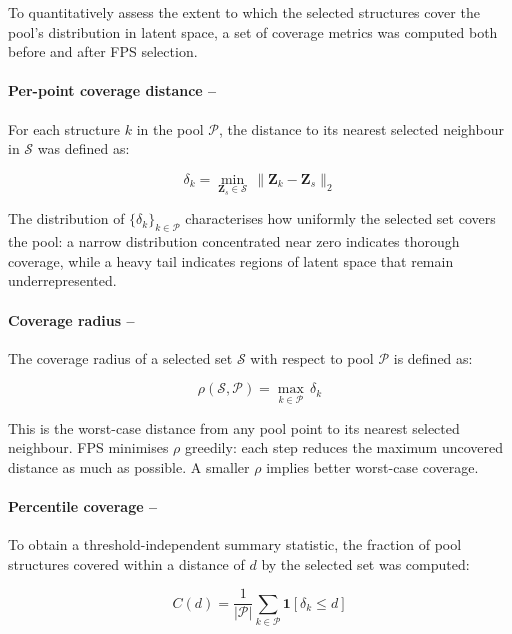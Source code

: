 \documentclass[12pt,a4paper,oneside]{book}
\begin{document}
To quantitatively assess the extent to which the selected structures cover
the pool's distribution in latent space, a set of coverage metrics was
computed both before and after FPS selection.

\paragraph{Per-point coverage distance --}
For each structure $k$ in the pool $\mathcal{P}$, the distance to its
nearest selected neighbour in $\mathcal{S}$ was defined as:

\begin{equation}
    \delta_k = \min_{\mathbf{Z}_s \in \mathcal{S}}\,
    \|\mathbf{Z}_k - \mathbf{Z}_s\|_2
\end{equation}

The distribution of $\{\delta_k\}_{k \in \mathcal{P}}$ characterises how
uniformly the selected set covers the pool: a narrow distribution concentrated
near zero indicates thorough coverage, while a heavy tail indicates regions of
latent space that remain underrepresented.

\paragraph{Coverage radius --}
The coverage radius of a selected set $\mathcal{S}$ with respect to pool
$\mathcal{P}$ is defined as:

\begin{equation}
    \rho(\mathcal{S}, \mathcal{P}) = \max_{k \in \mathcal{P}}\, \delta_k
\end{equation}

This is the worst-case distance from any pool point to its nearest selected
neighbour. FPS minimises $\rho$ greedily: each step reduces the maximum
uncovered distance as much as possible. A smaller $\rho$ implies better
worst-case coverage.

\paragraph{Percentile coverage --}
To obtain a threshold-independent summary statistic, the fraction of pool
structures covered within a distance of $d$ by the selected set was computed:

\begin{equation}
    C(d) = \frac{1}{|\mathcal{P}|} \sum_{k \in \mathcal{P}}
    \mathbf{1}\!\left[\delta_k \leq d\right]
\end{equation}
\end{document}
